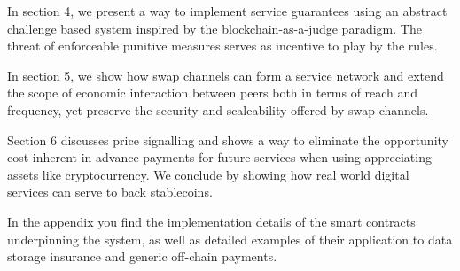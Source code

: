 In section 4, we present a way to implement service guarantees using an abstract
challenge based system inspired by the blockchain-as-a-judge paradigm. The threat
of enforceable punitive measures serves as incentive to play by the rules.

In section 5, we show how swap channels can form a service network and extend the
scope of economic interaction between peers both in terms of reach and frequency, yet
preserve the security and scaleability offered by swap channels.

Section 6 discusses price signalling and shows a way to eliminate the opportunity cost
inherent in advance payments for future services when using appreciating assets like cryptocurrency.
We conclude by showing how real world digital services can serve to back stablecoins.

In the appendix you find the implementation details of the smart contracts underpinning the system, as well as detailed examples of their application to data storage insurance and generic off-chain payments.
